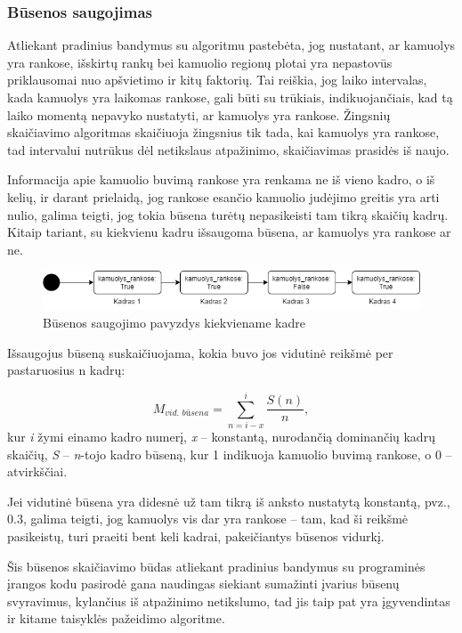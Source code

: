 \documentclass{VUMIFPSbakalaurinis}
\begin{document}
\subsubsection{Būsenos saugojimas}
Atliekant pradinius bandymus su algoritmu pastebėta, jog nustatant, ar kamuolys yra rankose, išskirtų rankų bei kamuolio regionų plotai yra nepastovūs priklausomai nuo apšvietimo ir kitų faktorių. Tai reiškia, jog laiko intervalas, kada kamuolys yra laikomas rankose, gali būti su trūkiais, indikuojančiais, kad tą laiko momentą nepavyko nustatyti, ar kamuolys yra rankose. Žingsnių skaičiavimo algoritmas skaičiuoja žingsnius tik tada, kai kamuolys yra rankose, tad intervalui nutrūkus dėl netikslaus atpažinimo, skaičiavimas prasidės iš naujo. 

Informacija apie kamuolio buvimą rankose yra renkama ne iš vieno kadro, o iš kelių, ir darant prielaidą, jog rankose esančio kamuolio judėjimo greitis yra arti nulio, galima teigti, jog tokia būsena turėtų nepasikeisti tam tikrą skaičių kadrų. Kitaip tariant, su kiekvienu kadru išsaugoma būsena, ar kamuolys yra rankose ar ne.

\begin{figure}[H]
	\centering
	\includegraphics[scale=0.6]{img/state}
	\caption{Būsenos saugojimo pavyzdys kiekviename kadre}
	\label{img:state}
\end{figure}

Išsaugojus būseną suskaičiuojama, kokia buvo jos vidutinė reikšmė per pastaruosius n kadrų: 

\begin{equation}\label{eq:avg_state}
	M_{\textit{vid. būsena}} = \sum_{n=i-x}^{i} \frac{S(n)}{n},
\end{equation}
kur \textit{i} žymi einamo kadro numerį, \textit{x} – konstantą, nurodančią dominančių kadrų skaičių, \textit{S} – \textit{n}-tojo kadro būseną, kur 1 indikuoja kamuolio buvimą rankose, o 0 – atvirkščiai.

Jei vidutinė būsena yra didesnė už tam tikrą iš anksto nustatytą konstantą, pvz., 0.3, galima teigti, jog kamuolys vis dar yra rankose – tam, kad ši reikšmė pasikeistų, turi praeiti bent keli kadrai, pakeičiantys būsenos vidurkį. 

Šis būsenos skaičiavimo būdas atliekant pradinius bandymus su programinės įrangos kodu pasirodė gana naudingas siekiant sumažinti įvarius būsenų svyravimus, kylančius iš atpažinimo netikslumo, tad jis taip pat yra įgyvendintas ir kitame taisyklės pažeidimo algoritme. 
\end{document}
